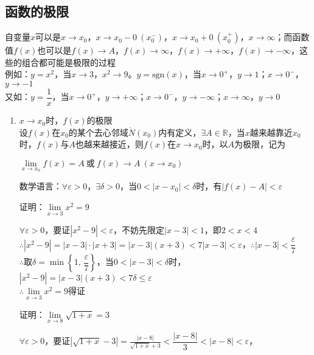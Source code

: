 \documentclass[11pt,fleqn]{book} %
\begin{document}
\subsection{函数的极限}
自变量$x$可以是$x\rightarrow x_0$，$x\rightarrow x_0-0\ (x_0^-)$，$x\rightarrow x_0+0\ (x_0^+)$，$x\rightarrow \infty$；而函数值$f(x)$也可以是$ f(x)\rightarrow A$，$f(x)\rightarrow \infty$，$f(x)\rightarrow +\infty$，$f(x)\rightarrow -\infty$，这些的组合都可能是极限的过程\\
例如：$y = x^2$，当$x\rightarrow 3$，$x^2\rightarrow 9$。$y = \text{sgn}(x)$，当$x\rightarrow 0^+$，$y\rightarrow 1$；$x\rightarrow 0^-$，$y\rightarrow -1$\\
又如：$y = \dfrac{1}{x}$，当$x\rightarrow 0^+$，$y\rightarrow +\infty$；$x\rightarrow 0^-$，$y\rightarrow -\infty$；$x\rightarrow \infty$，$y\rightarrow 0$
\begin{enumerate}
  \item $x\rightarrow x_0$时，$f(x)$的极限\\
设$f(x)$在$x_0$的某个去心邻域$\mathring{N}(x_0)$内有定义，$\exists A \in \mathds{R}$，当$x$越来越靠近$x_0$时，$f(x)$与$A$也越来越接近，则$f(x)$在$x\rightarrow x_0$时，以$A$为极限，记为
\begin{center}
$\lim\limits_{x\rightarrow x_0} f(x)=A\ \text{或}\ f(x)\rightarrow A\ (x\rightarrow x_0)$
\end{center}
数学语言：$\forall \varepsilon>0$，$\exists \delta>0$，当$0<|x-x_0|<\delta$时，有$|f(x)-A|<\varepsilon$
\begin{example}
 证明：$\lim\limits_{x\rightarrow 3} x^2=9$
\end{example}
\begin{prove}
 $\forall \varepsilon >0$，要证$|x^2-9|<\varepsilon$，不妨先限定$|x-3|<1$，即$2<x<4$\\
$\therefore |x^2-9|=|x-3|\cdot|x+3|=|x-3|(x+3)<7|x-3|<\varepsilon$，$\therefore |x-3|<\dfrac{\varepsilon}{7}$\\
$\therefore$取$\delta = \min \left\{1,\,\dfrac{\varepsilon}{7}\right\}$，当$0<|x-3|<\delta$时，$|x^2-9|=|x-3|(x+3)<7\delta\leqslant\varepsilon$\\
$\therefore \lim\limits_{x\rightarrow 3} x^2=9$得证
\end{prove}
\begin{example}
 证明：$\lim\limits_{x\rightarrow 8} \sqrt{1+x}=3$
\end{example}
\begin{prove}
 $\forall \varepsilon >0$，要证$|\sqrt{1+x}-3|=\frac{|x-8|}{\sqrt{1+x}+3}<\dfrac{|x-8|}{3}<|x-8|<\varepsilon$，\\

\end{prove}
\end{enumerate}
\end{document}
